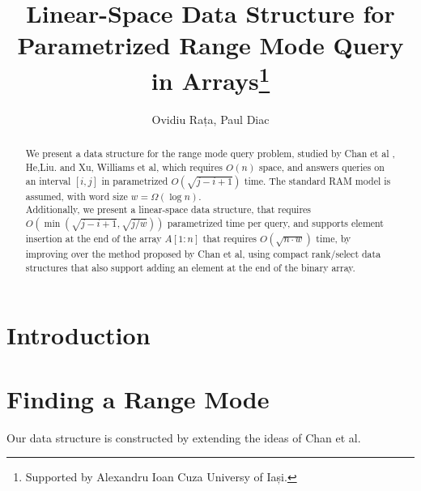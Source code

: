 \documentclass[runningheads]{llncs}
\begin{document}
%
\title{Linear-Space Data Structure for Parametrized Range Mode Query in Arrays\thanks{Supported by Alexandru Ioan Cuza Universy of Iași.}}
%
%
\author{Ovidiu Rața, Paul Diac}
%
%
%
\maketitle              %
%
\begin{abstract}
We present a data structure for the range mode query problem, studied by Chan et al \cite{chan2014linear}, He,Liu.\cite{he_et_al:LIPIcs.SEA.2023.19} and Xu, Williams et al\cite{gu2021faster}, which requires $O(n)$ space,
and answers queries on an interval $[i, j]$ in parametrized $O(\sqrt{j-i+1})$ time. The standard RAM model is assumed, with word size $w = \Omega ( \log n )$.\\

Additionally, we present a linear-space data structure, that requires \\ 
$O(\min( \sqrt{j-i+1}, \sqrt{j/w} ) )$ parametrized time per query, 
and supports element insertion at the end of the array $A[1:n]$ that requires $O( \sqrt{n \cdot w} )$ time, by improving over the method proposed by Chan et al\cite{chan2014linear}, using compact rank/select data structures 
that also support adding an element at the end of the binary array.


\end{abstract}
%
%
%
\section{Introduction}

\section{Finding a Range Mode}
Our data structure is constructed by extending the ideas of Chan et al\cite{chan2014linear}.
\end{document}
